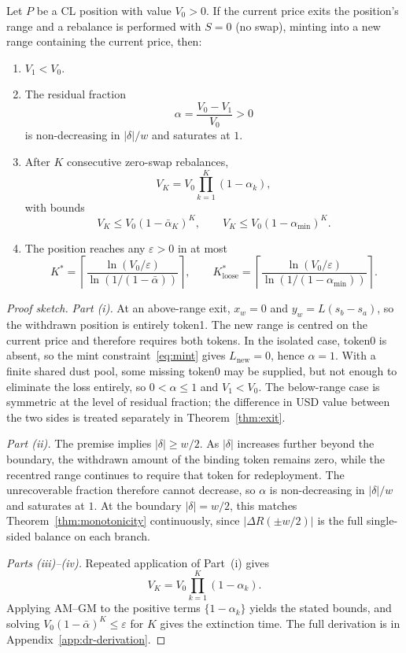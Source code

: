 \documentclass{manuscript}
\begin{document}
\begin{theorem}\label{thm:extinction}
Let $P$ be a CL position with value $V_0 > 0$. If the current price exits the position's range and a rebalance is performed with $S = 0$ (no swap), minting into a new range containing the current price, then:
\begin{enumerate}
\item $V_1 < V_0$.

\item The residual fraction
\[
\alpha = \frac{V_0 - V_1}{V_0} > 0
\]
is non-decreasing in $|\delta|/w$ and saturates at $1$.

\item After $K$ consecutive zero-swap rebalances,
\[
V_K = V_0 \prod_{k=1}^{K} (1 - \alpha_k),
\]
with bounds
\[
V_K \leq V_0(1 - \bar\alpha_K)^K,
\qquad
V_K \leq V_0(1 - \alpha_{\min})^K.
\]

\item The position reaches any $\varepsilon > 0$ in at most
\[
K^* = \left\lceil \frac{\ln(V_0/\varepsilon)}{\ln(1/(1 - \bar\alpha))} \right\rceil,
\qquad
K^*_{\text{loose}} = \left\lceil \frac{\ln(V_0/\varepsilon)}{\ln(1/(1 - \alpha_{\min}))} \right\rceil.
\]
\end{enumerate}
\end{theorem}

\begin{proof}[Proof sketch]
\emph{Part (i).} At an above-range exit, $x_w = 0$ and $y_w = L(s_b - s_a)$, so the withdrawn position is entirely token1. The new range is centred on the current price and therefore requires both tokens. In the isolated case, token0 is absent, so the mint constraint~\eqref{eq:mint} gives $L_{\text{new}} = 0$, hence $\alpha = 1$. With a finite shared dust pool, some missing token0 may be supplied, but not enough to eliminate the loss entirely, so $0 < \alpha \leq 1$ and $V_1 < V_0$. The below-range case is symmetric at the level of residual fraction; the difference in USD value between the two sides is treated separately in Theorem~\ref{thm:exit}.

\emph{Part (ii).} The premise implies $|\delta| \geq w/2$. As $|\delta|$ increases further beyond the boundary, the withdrawn amount of the binding token remains zero, while the recentred range continues to require that token for redeployment. The unrecoverable fraction therefore cannot decrease, so $\alpha$ is non-decreasing in $|\delta|/w$ and saturates at $1$. At the boundary $|\delta| = w/2$, this matches Theorem~\ref{thm:monotonicity} continuously, since $|\Delta R(\pm w/2)|$ is the full single-sided balance on each branch.

\emph{Parts (iii)--(iv).} Repeated application of Part~(i) gives
\[
V_K = V_0 \prod_{k=1}^{K} (1 - \alpha_k).
\]
Applying AM--GM to the positive terms $\{1 - \alpha_k\}$ yields the stated bounds, and solving $V_0(1 - \bar\alpha)^K \leq \varepsilon$ for $K$ gives the extinction time. The full derivation is in Appendix~\ref{app:dr-derivation}.
\end{proof}
\end{document}
